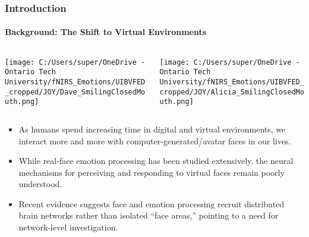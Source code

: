 \documentclass{beamer}
\begin{document}
\begin{frame}
    \frametitle{Introduction}
    \framesubtitle{Background: The Shift to Virtual Environments}
    \begin{columns}[c]
        \begin{column}{0.3\textwidth}
            \centering
            \texttt{[image: C:/Users/super/OneDrive - Ontario Tech University/fNIRS\_Emotions/UIBVFED\_cropped/JOY/Dave\_SmilingClosedMouth.png]}
        \end{column}
        \begin{column}{0.3\textwidth}
            \centering
            \texttt{[image: C:/Users/super/OneDrive - Ontario Tech University/fNIRS\_Emotions/UIBVFED\_cropped/JOY/Alicia\_SmilingClosedMouth.png]}
        \end{column}
    \end{columns}
    \begin{itemize}
        \item As humans spend increasing time in digital and virtual environments, we interact more and more with computer-generated/avatar faces in our lives. 
        \item While real-face emotion processing has been studied extensively, the neural mechanisms for perceiving and responding to virtual faces remain poorly understood. \cite{de_borst_is_2015}
        \item Recent evidence suggests face and emotion processing recruit distributed brain networks rather than isolated “face areas,” pointing to a need for network-level investigation. \cite{lindquist_brain_2012}
    \end{itemize}
\end{frame}
\end{document}
